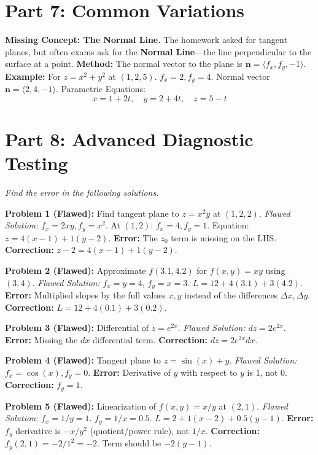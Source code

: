 \documentclass{article}
\begin{document}
\section{Part 7: Common Variations}
\textbf{Missing Concept: The Normal Line.}
The homework asked for tangent planes, but often exams ask for the \textbf{Normal Line}—the line perpendicular to the surface at a point.
\textbf{Method:} The normal vector to the plane is $\mathbf{n} = \langle f_x, f_y, -1 \rangle$.
\textbf{Example:} For $z = x^2 + y^2$ at $(1, 2, 5)$.
$f_x = 2, f_y = 4$. Normal vector $\mathbf{n} = \langle 2, 4, -1 \rangle$.
Parametric Equations:
\[ x = 1 + 2t, \quad y = 2 + 4t, \quad z = 5 - t \]

\section{Part 8: Advanced Diagnostic Testing}
\textit{Find the error in the following solutions.}

\textbf{Problem 1 (Flawed):} Find tangent plane to $z = x^2 y$ at $(1, 2, 2)$.
\textit{Flawed Solution:} $f_x = 2xy, f_y = x^2$. At $(1,2)$: $f_x = 4, f_y = 1$.
Equation: $z = 4(x-1) + 1(y-2)$.
\textbf{Error:} The $z_0$ term is missing on the LHS.
\textbf{Correction:} $z - 2 = 4(x-1) + 1(y-2)$.

\textbf{Problem 2 (Flawed):} Approximate $f(3.1, 4.2)$ for $f(x,y)=x y$ using $(3,4)$.
\textit{Flawed Solution:} $f_x = y = 4$, $f_y = x = 3$.
$L = 12 + 4(3.1) + 3(4.2)$.
\textbf{Error:} Multiplied slopes by the full values $x, y$ instead of the differences $\Delta x, \Delta y$.
\textbf{Correction:} $L = 12 + 4(0.1) + 3(0.2)$.

\textbf{Problem 3 (Flawed):} Differential of $z = e^{2x}$.
\textit{Flawed Solution:} $dz = 2e^{2x}$.
\textbf{Error:} Missing the $dx$ differential term.
\textbf{Correction:} $dz = 2e^{2x} dx$.

\textbf{Problem 4 (Flawed):} Tangent plane to $z = \sin(x) + y$.
\textit{Flawed Solution:} $f_x = \cos(x), f_y = 0$.
\textbf{Error:} Derivative of $y$ with respect to $y$ is 1, not 0.
\textbf{Correction:} $f_y = 1$.

\textbf{Problem 5 (Flawed):} Linearization of $f(x,y) = x/y$ at $(2, 1)$.
\textit{Flawed Solution:} $f_x = 1/y = 1$. $f_y = 1/x = 0.5$.
$L = 2 + 1(x-2) + 0.5(y-1)$.
\textbf{Error:} $f_y$ derivative is $-x/y^2$ (quotient/power rule), not $1/x$.
\textbf{Correction:} $f_y(2,1) = -2/1^2 = -2$. Term should be $-2(y-1)$.
\end{document}
